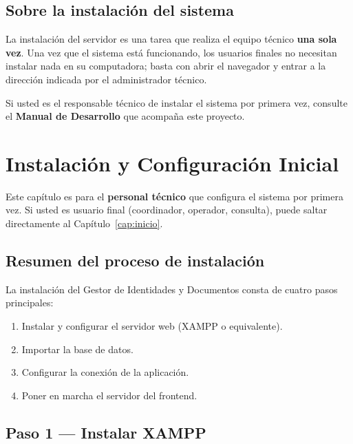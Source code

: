 \documentclass[10pt,letterpaper]{report}
\begin{document}
\section{Sobre la instalación del sistema}

La instalación del servidor es una tarea que realiza el equipo técnico \textbf{una sola vez}. Una vez que el sistema está funcionando, los usuarios finales no necesitan instalar nada en su computadora; basta con abrir el navegador y entrar a la dirección indicada por el administrador técnico.

Si usted es el responsable técnico de instalar el sistema por primera vez, consulte el \textbf{Manual de Desarrollo} que acompaña este proyecto.

\chapter{Instalación y Configuración Inicial}
\label{cap:instalacion}

\begin{importantebox}
Este capítulo es para el \textbf{personal técnico} que configura el sistema por primera vez. Si usted es usuario final (coordinador, operador, consulta), puede saltar directamente al Capítulo~\ref{cap:inicio}.
\end{importantebox}

\section{Resumen del proceso de instalación}

La instalación del Gestor de Identidades y Documentos consta de cuatro pasos principales:

\begin{enumerate}[label=\arabic*.]
  \item Instalar y configurar el servidor web (XAMPP o equivalente).
  \item Importar la base de datos.
  \item Configurar la conexión de la aplicación.
  \item Poner en marcha el servidor del frontend.
\end{enumerate}

\section{Paso 1 — Instalar XAMPP}
\end{document}

